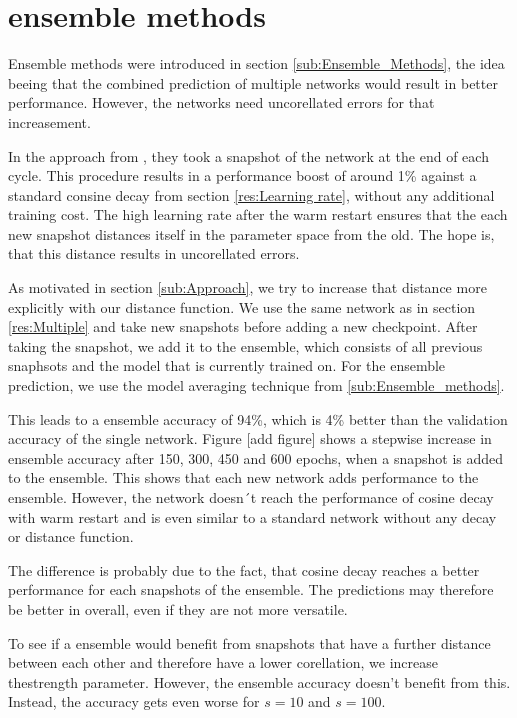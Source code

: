 \section{ensemble methods}\label{res:Ensemble}
Ensemble methods were introduced in section \ref{sub:Ensemble_Methods}, the idea
beeing that the combined prediction of multiple networks would result in better
performance. However, the networks need uncorellated errors for that
increasement.

In the approach from \cite{loshchilov2016sgdr}, they took a snapshot of the
network at the end of each cycle. This procedure results in a performance boost
of around 1\% against a standard consine decay from section \ref{res:Learning rate},
without any additional training cost. The high learning rate after the warm
restart ensures that the each new snapshot distances itself in the parameter
space from the old. The hope is, that this distance results in uncorellated
errors.

As motivated in section \ref{sub:Approach}, we try to increase that distance
more explicitly with our distance function. We use the same network as in
section \ref{res:Multiple} and take new snapshots before adding a new
checkpoint. After taking the snapshot, we add it to the ensemble, which consists
of all previous snaphsots and the model that is currently trained on. For the
ensemble prediction, we use the model averaging technique from
\ref{sub:Ensemble_methods}.


This leads to a ensemble accuracy of 94\%, which is 4\% better than
the validation accuracy of the single network. Figure [add figure] shows a
stepwise increase in ensemble accuracy after 150, 300, 450 and 600 epochs, when
a snapshot is added to the ensemble. This shows that each new network adds
performance to the ensemble. However, the network doesn´t reach the performance
of cosine decay with warm restart and is even similar to a standard network
without any decay or distance function.

The difference is probably due to the fact, that cosine decay reaches a better
performance for each snapshots of the ensemble. The predictions may therefore be
better in overall, even if they are not more versatile.

To see if a ensemble would benefit from snapshots that have a further distance
between each other and therefore have a lower corellation, we increase
thestrength parameter. However, the ensemble accuracy doesn't benefit from this.
Instead, the accuracy gets even worse for $s=10$ and $s=100$. 

